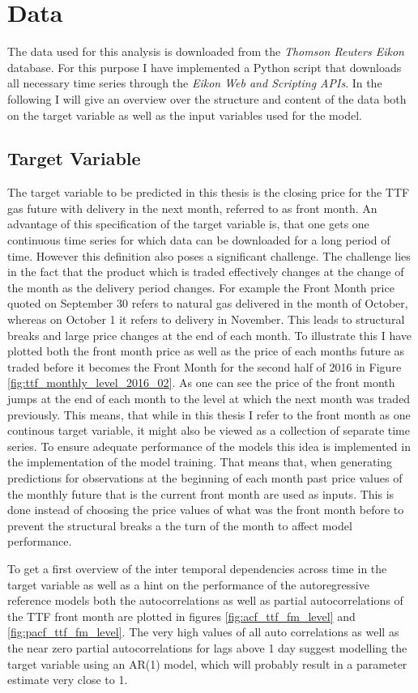 \section{Data}\label{Sec:Data}
The data used for this analysis is downloaded from the \textit{Thomson Reuters Eikon} database. For this purpose I have implemented a Python script that downloads all necessary time series through the \textit{Eikon Web and Scripting APIs}. In the following I will give an overview over the structure and content of the data both on the target variable as well as the input variables used for the model. 
\subsection{Target Variable}
The target variable to be predicted in this thesis is the closing price for the TTF gas future with delivery in the next month, referred to as front month. An advantage of this specification of the target variable is, that one gets one continuous time series for which data can be downloaded for a long period of time. However this definition also poses a significant challenge. The challenge lies in the fact that the product which is traded effectively changes at the change of the month as the delivery period changes. For example the Front Month price quoted on September 30 refers to natural gas delivered in the month of October, whereas on October 1 it refers to delivery in November. This leads to structural breaks and large price changes at the end of each month. To illustrate this I have plotted both the front month price as well as the price of each months future as traded before it becomes the Front Month for the second half of 2016 in Figure \ref{fig:ttf_monthly_level_2016_02}. As one can see the price of the front month jumps at the end of each month to the level at which the next month was traded previously.  This means, that while in this thesis I refer to the front month as one continous target variable, it might also be viewed as a collection of separate time series. To ensure adequate performance of the models this idea is implemented in the implementation of the model training. That means that, when generating predictions for observations at the beginning of each month past price values of the monthly future that is the current front month are used as inputs. This is done instead of choosing the price values of what was the front month before to prevent the structural breaks a the turn of the month to affect model performance.  

To get a first overview of the inter temporal dependencies across time in the target variable as well as a hint on the performance of the autoregressive reference models both the autocorrelations  as well as partial autocorrelations of the TTF front month are plotted in figures \ref{fig:acf_ttf_fm_level} and \ref{fig:pacf_ttf_fm_level}. The very high values of all auto correlations as well as the near zero partial autocorrelations for lags above 1 day suggest modelling the target variable using an AR(1) model, which will probably result in a parameter estimate very close to 1. 



